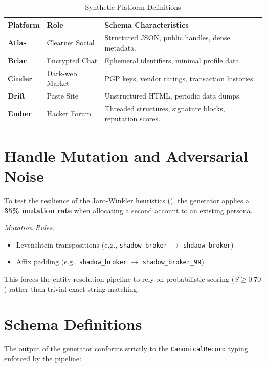 \begin{table}[h]
\centering
\begin{tabular}{p{} p{} p{}}
\toprule
\textbf{Platform} & \textbf{Role} & \textbf{Schema Characteristics} \\
\midrule
\textbf{Atlas} & Clearnet Social & Structured JSON, public handles, dense metadata. \\
\textbf{Briar} & Encrypted Chat & Ephemeral identifiers, minimal profile data. \\
\textbf{Cinder} & Dark-web Market & PGP keys, vendor ratings, transaction histories. \\
\textbf{Drift} & Paste Site & Unstructured HTML, periodic data dumps. \\
\textbf{Ember} & Hacker Forum & Threaded structures, signature blocks, reputation scores. \\
\bottomrule
\end{tabular}
\caption{Synthetic Platform Definitions}
\label{tab:app-platform-defs}
\end{table}

\section{Handle Mutation and Adversarial Noise}
\label{app-sec:handle-mutation}
To test the resilience of the Jaro-Winkler heuristics (), the generator applies a \textbf{35\% mutation rate} when allocating a second account to an existing persona. 

\textit{Mutation Rules:}
\begin{itemize}
    \item Levenshtein transpositions (e.g., \texttt{shadow\_broker} $\rightarrow$ \texttt{shdaow\_broker})
    \item Affix padding (e.g., \texttt{shadow\_broker} $\rightarrow$ \texttt{shadow\_broker\_99})
\end{itemize}

This forces the entity-resolution pipeline to rely on probabilistic scoring ($S \ge 0.70$) rather than trivial exact-string matching.

\section{Schema Definitions}
\label{app-sec:schema-definitions}
The output of the generator conforms strictly to the \texttt{CanonicalRecord} typing enforced by the pipeline:

